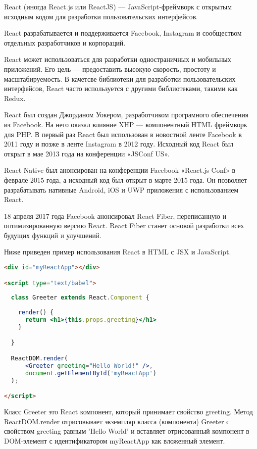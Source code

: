 React (иногда React.js или ReactJS) — JavaScript-фреймворк с открытым исходным кодом для разработки пользовательских интерфейсов.

React разрабатывается и поддерживается Facebook, Instagram и сообществом отдельных разработчиков и корпораций.

React может использоваться для разработки одностраничных и мобильных приложений. Его цель — предоставить высокую скорость,
простоту и масштабируемость. В качетсве библиотеки для разработки пользовательских интерфейсов, React часто используется с другими библиотеками,
такими как Redux.

React был создан Джорданом Уокером, разработчиком програмного обеспечения из Facebook. На него оказал влияние XHP — компонентный HTML фреймворк для PHP.
В первый раз React был использован в новостной ленте Facebook в 2011 году и позже в ленте Instagram в 2012 году. Исходный код React был открыт в мае 2013
года на конференции «JSConf US».

React Native был анонсирован на конференции Facebook «React.js Conf» в феврале 2015 года, а исходный код был открыт в марте 2015 года. Он позволяет
разрабатывать нативные Android, iOS и UWP приложения с использованием React.

18 апреля 2017 года Facebook анонсировал React Fiber, переписанную и оптимизированную версию React. React Fiber станет основой разработки всех
будущих функций и улучшений.

Ниже приведен пример использования React в HTML с JSX и JavaScript.

\begin{lstlisting}[language=HTML, label=lst:domain:reactjs]
<div id="myReactApp"></div>

<script type="text/babel">
  
  class Greeter extends React.Component { 
    
    render() { 
      return <h1>{this.props.greeting}</h1>
    } 

  } 

  ReactDOM.render(
      <Greeter greeting="Hello World!" />,
      document.getElementById('myReactApp')
  );

</script>
\end{lstlisting}

Класс Greeter это React компонент, который принимает свойство greeting. Метод ReactDOM.render отрисовывает
экземпляр класса (компонента) Greeter с свойством greeting равным 'Hello World' и вставляет отрисованный компонент в
DOM-элемент с идентификатором myReactApp как вложенный элемент.

